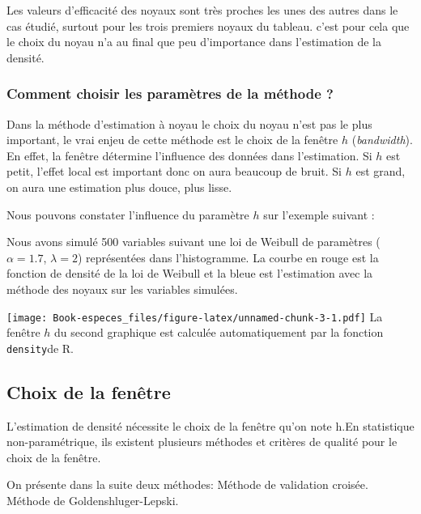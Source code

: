 \documentclass[
]{book}
\begin{document}
\begin{rem}
Les valeurs d'efficacité des noyaux sont très proches les unes des autres dans le cas étudié, surtout pour les trois premiers noyaux du tableau. c'est pour cela que le choix du noyau n'a au final que peu d'importance dans l'estimation de la densité. 
\end{rem}

\hypertarget{comment-choisir-les-paramuxe8tres-de-la-muxe9thode}{%
\subsubsection{Comment choisir les paramètres de la méthode ?}\label{comment-choisir-les-paramuxe8tres-de-la-muxe9thode}}

Dans la méthode d'estimation à noyau le choix du noyau n'est pas le plus important, le vrai enjeu de cette méthode est le choix de la fenêtre \(h\) (\emph{bandwidth}).
En effet, la fenêtre détermine l'influence des données dans l'estimation. Si \(h\) est petit, l'effet local est important donc on aura beaucoup de bruit. Si \(h\) est grand, on aura une estimation plus douce, plus lisse.

Nous pouvons constater l'influence du paramètre \(h\) sur l'exemple suivant :

Nous avons simulé 500 variables suivant une loi de Weibull de paramètres (\(\alpha = 1.7\), \(\lambda=2\)) représentées dans l'histogramme. La courbe en rouge est la fonction de densité de la loi de Weibull et la bleue est l'estimation avec la méthode des noyaux sur les variables simulées.

\texttt{[image: Book-especes\_files/figure-latex/unnamed-chunk-3-1.pdf]}
La fenêtre \(h\) du second graphique est calculée automatiquement par la fonction \texttt{density}de R.

\hypertarget{choix-de-la-fenuxeatre}{%
\subsection{Choix de la fenêtre}\label{choix-de-la-fenuxeatre}}

L'estimation de densité nécessite le choix de la fenêtre qu'on note h.\newline En statistique non-paramétrique, ils existent plusieurs méthodes et critères de qualité pour le choix de la fenêtre.\newline

On présente dans la suite deux méthodes:\newline
\hspace*{0.5cm} Méthode de validation croisée.\newline
\hspace*{0.5cm} Méthode de Goldenshluger-Lepski.\newline
\end{document}
